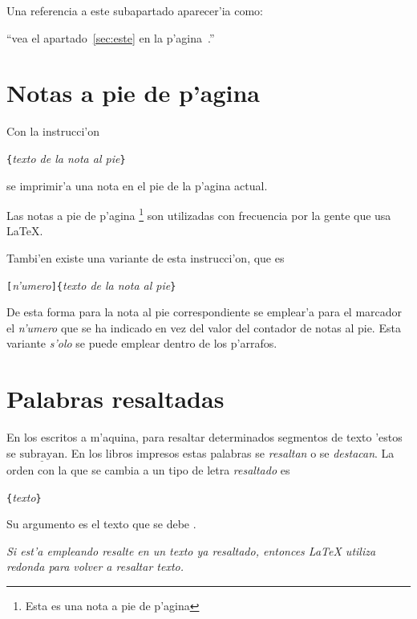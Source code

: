 \begin{example}
Una referencia a este subapartado
\label{sec:este} aparecer'ia como:

``vea el apartado~\ref{sec:este} en
la p'agina~\pageref{sec:este}.''
\end{example}

\section{Notas a pie de p'agina}

Con la instrucci'on
\begin{command}
\verb|{|\emph{texto de la nota al pie}\verb|}|
\end{command}
\noindent se imprimir'a una nota en el pie de la p'agina actual.

\begin{example}
Las notas a pie de p'agina%
\footnote{Esta es una nota a pie
de p'agina} son utilizadas con
frecuencia por la gente que usa
\LaTeX.
\end{example}

Tambi'en existe una variante de esta instrucci'on, que es
\begin{command}
\verb|[|\emph{n'umero}\verb|]{|\emph{texto de la nota al
    pie}\verb|}|
\end{command}
De esta forma para la nota al pie correspondiente se emplear'a para el
marcador el \emph{n'umero} que se ha indicado en vez del valor del
contador de notas al pie. Esta variante \emph{s'olo} se puede emplear
dentro de los p'arrafos.

\section{Palabras resaltadas}

En los escritos a m'aquina, para resaltar determinados segmentos de
texto 'estos se $\underline{\mathrm{subrayan}}$. En los libros
impresos estas palabras se \emph{resaltan} o se \emph{destacan}. La
orden con la que se cambia a un tipo de letra \emph{resaltado} es
\begin{command}
\verb|{|\emph{texto}\verb|}|
\end{command}
\noindent Su argumento es el texto que se debe .

\begin{example}
\emph{Si est'a empleando
\emph{resalte} en un texto
ya resaltado, entonces \LaTeX{}
utiliza \emph{redonda} para volver
a resaltar texto.}
\end{example}


